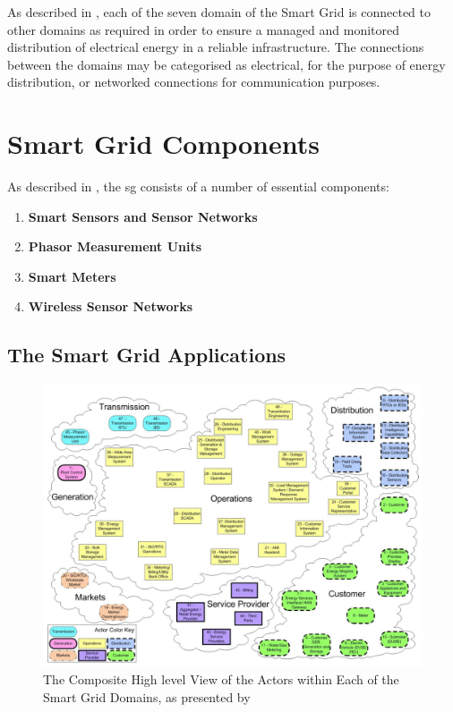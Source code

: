 As described in \cite{wang2011survey}, each of the seven domain of the Smart Grid is connected to other domains as required in order to ensure a managed and monitored distribution of electrical energy in a reliable infrastructure. The connections between the domains may be categorised as electrical, for the purpose of energy distribution, or networked connections for communication purposes.




\section{Smart Grid Components}



As described in \cite{Kabalci2019}, the \acrshort{sg} consists of a number of essential components:



\begin{enumerate}
    \item \textbf{Smart Sensors and Sensor Networks}
    \item \textbf{Phasor Measurement Units}
    \item \textbf{Smart Meters}
    \item \textbf{Wireless Sensor Networks}
    \end{enumerate}
\subsection{The Smart Grid Applications}
\begin{figure}[ht]
\includegraphics[width=\linewidth]{figures/NIST-Composite-High-level-View-of-the-Actors-within-Each-of-the-Smart-Grid-Domains.png}
\caption{The Composite High level View of the Actors within Each of the Smart Grid Domains, as presented by \cite{nist2010guidelines}} \label{fig:NIST-Composite-High-level-View-of-the-Actors-within-Each-of-the-Smart-Grid-Domains}
\end{figure}


